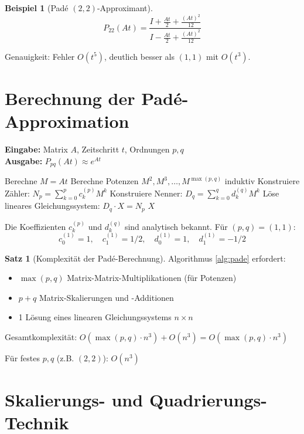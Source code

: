 ﻿\documentclass[a4paper,12pt]{report}
\theoremstyle{definition}
\newtheorem{beispiel}{Beispiel}
\newtheorem{satz}{Satz}
\begin{document}
	\begin{beispiel}[Padé $(2,2)$-Approximant]
		\[
		P_{22}(At) = \frac{I + \frac{At}{2} + \frac{(At)^2}{12}}{I - \frac{At}{2} + \frac{(At)^2}{12}}
		\]
		
		Genauigkeit: Fehler $O(t^5)$, deutlich besser als $(1,1)$ mit $O(t^3)$.
	\end{beispiel}
	
	\section{Berechnung der Padé-Approximation}
	
	\begin{algorithm}[H]
		\caption{Padé-Approximation für Matrixexponential}
		\label{alg:pade}
		\textbf{Eingabe:} Matrix $A$, Zeitschritt $t$, Ordnungen $p, q$ \\
		\textbf{Ausgabe:} $P_{pq}(At) \approx e^{At}$
		\begin{algorithmic}[1]
			\State Berechne $M = At$
			\State Berechne Potenzen $M^2, M^3, \ldots, M^{\max(p,q)}$ induktiv
			\State Konstruiere Zähler: $N_p = \sum_{k=0}^p c_k^{(p)} M^k$
			\State Konstruiere Nenner: $D_q = \sum_{k=0}^q d_k^{(q)} M^k$
			\State Löse lineares Gleichungssystem: $D_q \cdot X = N_p$
			\State \Return $X$
		\end{algorithmic}
	\end{algorithm}
	
	Die Koeffizienten $c_k^{(p)}$ und $d_k^{(q)}$ sind analytisch bekannt. Für $(p,q) = (1,1)$:
	\[
	c_0^{(1)} = 1, \quad c_1^{(1)} = 1/2, \quad d_0^{(1)} = 1, \quad d_1^{(1)} = -1/2
	\]
	
	\begin{satz}[Komplexität der Padé-Berechnung]
		Algorithmus \ref{alg:pade} erfordert:
		\begin{itemize}
			\item $\max(p,q)$ Matrix-Matrix-Multiplikationen (für Potenzen)
			\item $p + q$ Matrix-Skalierungen und -Additionen
			\item 1 Lösung eines linearen Gleichungssystems $n \times n$
		\end{itemize}
		
		Gesamtkomplexität: $O(\max(p,q) \cdot n^3) + O(n^3) = O(\max(p,q) \cdot n^3)$
		
		Für festes $p, q$ (z.B. $(2,2)$): $O(n^3)$
	\end{satz}
	
	\section{Skalierungs- und Quadrierungs-Technik}
	
\end{document}
